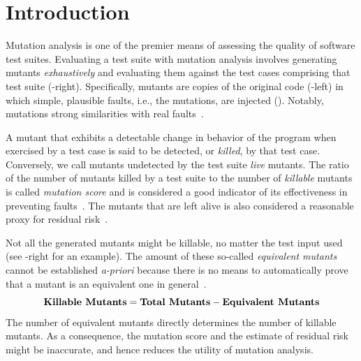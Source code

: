 \documentclass[sigconf,review,anonymous]{acmart}
\begin{document}
\section{Introduction}
Mutation analysis is one of the premier means of assessing the quality of
software test suites\cite{papadakis2019mutation}. %
Evaluating a test suite with mutation analysis involves
generating mutants \emph{exhaustively} and evaluating them against the test cases comprising that test suite
(-right).
%
Specifically, mutants are copies of the original code (-left) in which simple, plausible faults, i.e., the mutations, are injected ().
Notably, mutations strong similarities with real faults~\cite{daran1996software,just2014are,andrews2005is,andrews2006using}.

A mutant that exhibits a detectable change in behavior of the program when
exercised by a test case is said to be detected, or \emph{killed}, by that
test case. Conversely, we call mutants undetected by the test suite \emph{live} mutants.
%
The ratio of the number of mutants killed by a test suite to the 
number of \emph{killable} mutants %
is called \emph{mutation score} and  is considered a good indicator of its
effectiveness in preventing faults~\cite{jia2010an}.
The mutants that are left alive is also considered
a reasonable proxy for residual risk~\cite{horgan1996software}.

Not all the generated mutants might be killable, no matter the test input used~\cite{budd1982two}
(see -right for an example).
%
The amount of these so-called \emph{equivalent mutants} cannot be established 
\emph{a-priori} because there is no means to automatically prove that a mutant
is an equivalent one in general~\cite{budd1982two,rice1953classes}. 
%
$$
\text{\textbf{Killable Mutants}} = \text{\textbf{Total Mutants}} - \text{\textbf{Equivalent Mutants}}
$$
The number of equivalent mutants directly determines the number of killable mutants.
As a consequence, the mutation score and the estimate of residual risk might be inaccurate, and hence reduces the utility of mutation analysis.
\end{document}
